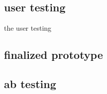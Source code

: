 \subsection{user testing}%
\label{sub:usertesting}
the user testing 

\subsection{ finalized prototype }%
\label{sub:finalizingprototype}

\subsection{ ab testing }%
\label{sub:mabtesting}
